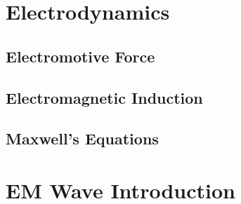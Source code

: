 \documentclass[12pt,a4paper,twoside]{article}
\numberwithin{equation}{section}
\begin{document}
\section{Electrodynamics}
\subsection{Electromotive Force}
\subsection{Electromagnetic Induction}
\subsection{Maxwell's Equations}



\section{EM Wave Introduction}
\end{document}
